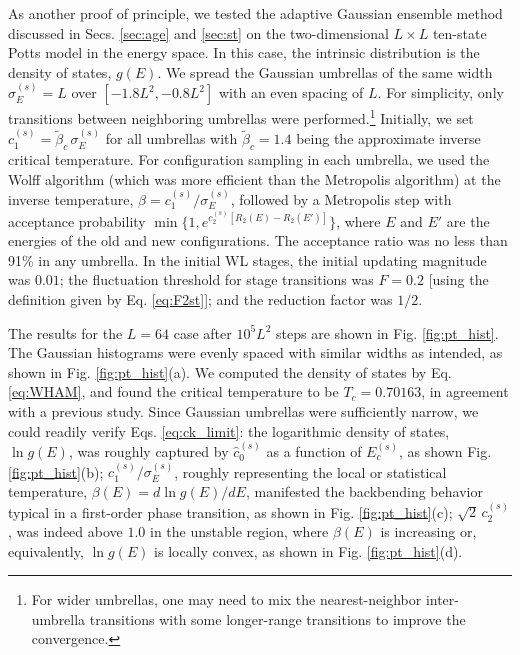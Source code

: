 \documentclass[reprint, superscriptaddress, floatfix]{revtex4-1}
\newcommand{\note}[1]{{\color{DarkGreen}\footnotesize \textsc{Note.} #1}}
\begin{document}
As another proof of principle,
we tested the adaptive Gaussian ensemble method
discussed in Secs. \ref{sec:age} and \ref{sec:st}
on the two-dimensional $L\times L$ ten-state
Potts model\cite{wu1982, newman, wang2001, wang2001pre}
in the energy space.
%
In this case, %
the intrinsic distribution is
the density of states, $g(E)$.
%
We spread the Gaussian umbrellas
of the same width $\sigma_E^{(s)} = L$ over $[-1.8L^2, -0.8L^2]$
with an even spacing of $L$.
%
For simplicity, only transitions between neighboring
umbrellas were performed.\footnote{For
  wider umbrellas,
  one may need to mix the nearest-neighbor inter-umbrella transitions
  with some longer-range transitions
  to improve the convergence.}
%
%
Initially, we set
$c_1^{(s)} = \tilde \beta_c \, \sigma_E^{(s)}$
for all umbrellas
with $\tilde \beta_c = 1.4$
being the approximate inverse critical temperature.
%
For configuration sampling in each umbrella,
we used the Wolff algorithm\cite{wolff1989, newman}
(which was more efficient than the Metropolis algorithm)
at the inverse temperature, $\beta = c_1^{(s)}/\sigma_E^{(s)}$,
followed by a Metropolis step with
acceptance probability
$\min\bigl\{1, e^{c_2^{(s)} [R_2(E) - R_2(E')]} \bigr\}$,
where $E$ and $E'$ are the energies of the old and new configurations.
%
The acceptance ratio was no less than 91\% in any umbrella.
%
In the initial WL stages,
the initial updating magnitude was $0.01$;
the fluctuation threshold for stage transitions
was $F = 0.2$ [using the definition given by Eq. \eqref{eq:F2st}];
and the reduction factor was $1/2$.

The results for the $L = 64$ case
after $10^5 L^2$ steps are shown
in Fig. \ref{fig:pt_hist}.
%
The Gaussian histograms were evenly spaced with similar widths as intended,
as shown in Fig. \ref{fig:pt_hist}(a).
%
We computed the density of states by Eq. \eqref{eq:WHAM},
and found the critical temperature to be $T_c = 0.70163$,
in agreement with a previous study\cite{wang2001pre}.
%
Since Gaussian umbrellas were sufficiently narrow,
we could readily verify
Eqs. \eqref{eq:ck_limit}:
the logarithmic density of states, $\ln g(E)$,
was roughly captured
by $\hat c_0^{(s)}$ as a function of $E_c^{(s)}$,
as shown Fig. \ref{fig:pt_hist}(b);
%
$c_1^{(s)}/\sigma_E^{(s)}$, roughly representing
the local or statistical temperature, $\beta(E) = d\ln g(E)/dE$,
manifested the backbending behavior\cite{kim2006, *kim2007, kim2010}
typical in a first-order phase transition,
as shown in Fig. \ref{fig:pt_hist}(c);
%
$\sqrt 2 \, c_2^{(s)}$,
was indeed above $1.0$
in the unstable region,
where $\beta(E)$ is increasing or, equivalently,
$\ln g(E)$ is locally convex,
as shown in Fig. \ref{fig:pt_hist}(d).
\end{document}
